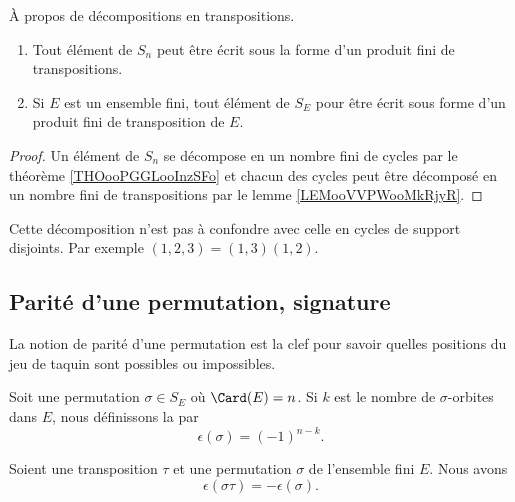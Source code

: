 \begin{proposition} \label{PropPWIJbu}
	À propos de décompositions en transpositions.
	\begin{enumerate}
		\item
		      Tout élément de \( S_n\) peut être écrit sous la forme d'un produit fini de transpositions.
		\item
		      Si \( E \) est un ensemble fini, tout élément de \( S_E\) pour être écrit sous forme d'un produit fini de transposition de \( E\).
	\end{enumerate}
\end{proposition}

\begin{proof}
	Un élément de \( S_n\) se décompose en un nombre fini de cycles par le théorème \ref{THOooPGGLooInzSFo} et chacun des cycles peut être décomposé en un nombre fini de transpositions par le lemme \ref{LEMooVVPWooMkRjyR}.
\end{proof}

Cette décomposition n'est pas à confondre avec celle en cycles de support disjoints. Par exemple \( (1,2,3)=(1,3)(1,2)\).

\subsection{Parité d'une permutation, signature}

La notion de parité d'une permutation est la clef pour savoir quelles positions du jeu de taquin sont possibles ou impossibles\cite{BIBooGLIWooAggcqh,BIBooCDDXooYWCtNZ}.

\begin{definition}	\label{DEFooYDUHooKIXGNW}
	Soit une permutation \( \sigma\in S_E\) où \( \Card(E)=n\). Si \( k\) est le nombre de \( \sigma\)-orbites dans \( E\), nous définissons la  par
	\begin{equation}
		\epsilon(\sigma)=(-1)^{n-k}.
	\end{equation}
\end{definition}

\begin{proposition}	\label{PROPooWCHBooTgMokj}
	Soient une transposition \( \tau\) et une permutation \( \sigma\) de l'ensemble fini \( E\). Nous avons
	\begin{equation}
		\epsilon(\sigma\tau)=-\epsilon(\sigma).
	\end{equation}
\end{proposition}

